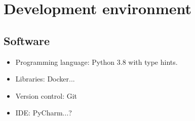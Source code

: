 \section{Development environment}
\subsection{Software}
\begin{itemize}
\item Programming language: Python 3.8 with type hints.
\item Libraries: Docker...
\item Version control: Git
\item IDE: PyCharm...?
\end{itemize}
